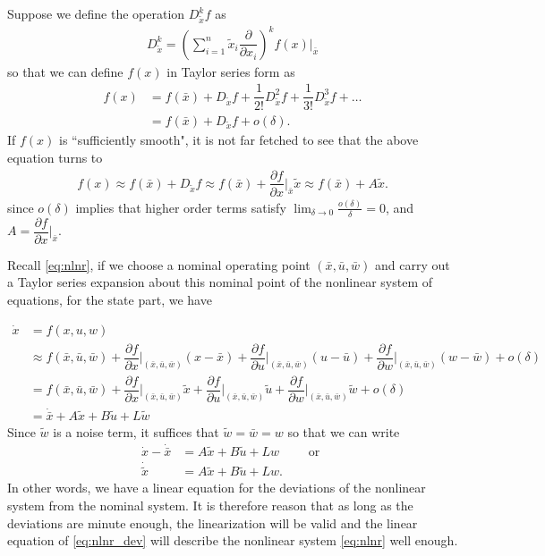%
Suppose we define the operation $D^k_{\tilde{x}}f$ as 
%
\begin{align}
	D^k_{\tilde{x}} = \left(\sum_{i=1}^{n} \tilde{x}_i \dfrac{\partial}{\partial x_i}\right)^k f(x) \bigg \rvert_{\bar{x}}
\end{align}
%
so that we can define $f(x)$ in Taylor series form as 
%
\begin{align}
	f(x) &= f(\bar{x}) + D_{\tilde{x}} f + \dfrac{1}{2!} D^2_{\tilde{x}} f + \dfrac{1}{3!} D^3_{\tilde{x}} f + \ldots \\
	& = f(\bar{x}) + D_{\tilde{x}} f +o(\delta).
\end{align}
%
If $f(x)$ is ``sufficiently smooth", it is not far fetched to see that the above equation turns to
%
\begin{align}
	f(x) \approx f(\bar{x}) + D_{\tilde{x}} f \approx  f(\bar{x}) + \dfrac{\partial f}{\partial x}\rvert_{\bar{x}} \tilde{x} \approx  f(\bar{x}) + A \tilde{x}.
\end{align} 
%
since $o(\delta)$ implies that higher order terms satisfy $\lim_{\delta\rightarrow 0} \frac{o(\delta)}{\delta}=0$, and $A = \dfrac{\partial f}{\partial x}\bigg\rvert_{\bar{x}}$.

Recall \eqref{eq:nlnr}, if we choose a nominal operating point $(\bar{x}, \bar{u}, \bar{w})$ and carry out a Taylor series expansion about this nominal point of the nonlinear system of equations, for the state part, we have

\begin{align}
	\dot{x} &= f(x, u, w) \nonumber \\
	&\approx f(\bar{x}, \bar{u}, \bar{w}) + \dfrac{\partial f}{\partial x}\bigg\rvert_{(\bar{x}, \bar{u}, \bar{w})} (x - \bar{x}) +  \dfrac{\partial f}{\partial u}\bigg\rvert_{(\bar{x}, \bar{u}, \bar{w})} (u - \bar{u}) +  \dfrac{\partial f}{\partial w}\bigg\rvert_{(\bar{x}, \bar{u}, \bar{w})} (w - \bar{w}) + o(\delta)  \\
	& = 	 f(\bar{x}, \bar{u}, \bar{w}) + \dfrac{\partial f}{\partial x}\bigg\rvert_{(\bar{x}, \bar{u}, \bar{w})} \tilde{x} +  \dfrac{\partial f}{\partial u}\bigg\rvert_{(\bar{x}, \bar{u}, \bar{w})} \tilde{u} +  \dfrac{\partial f}{\partial w}\bigg\rvert_{(\bar{x}, \bar{u}, \bar{w})} \tilde{w} + o(\delta) \nonumber \\
	& = 	 \dot{\bar{x}} + A \tilde{x} +  B \tilde{u} +  L \tilde{w} \nonumber 
\end{align}
%
Since $\tilde{w}$ is a noise term, it suffices that $\tilde{w} = \bar{w}= w$ so that we can write
%
\begin{align}
	\dot{x} - \dot{\bar{x}} &=  A \tilde{x} +  B \tilde{u} +  L w \qquad \text{ or }\nonumber \\
	\dot{\tilde{x}} &= A \tilde{x} +  B \tilde{u} +  L w.
	\label{eq:nlnr_dev}
\end{align}
%
In other words, we have a linear equation for the deviations of the nonlinear system from the nominal system. It is therefore reason that as long as the deviations are minute enough, the linearization will be valid and the linear equation of \eqref{eq:nlnr_dev} will describe the nonlinear system \eqref{eq:nlnr} well enough. 

